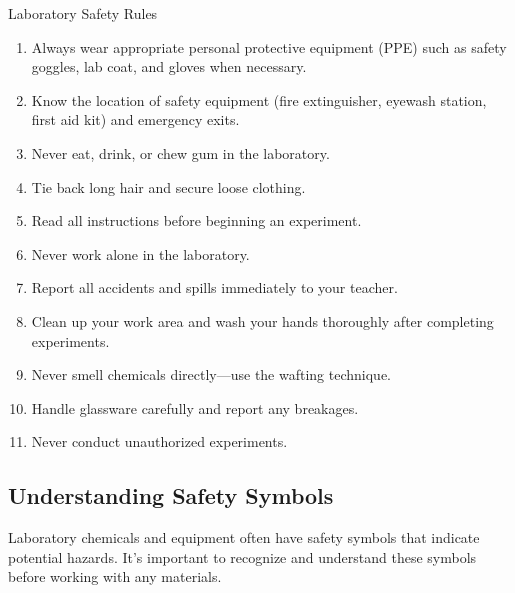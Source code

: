 \begin{keyconcept}{Laboratory Safety Rules}
\begin{enumerate}
    \item Always wear appropriate personal protective equipment (PPE) such as safety goggles, lab coat, and gloves when necessary.
    
    \item Know the location of safety equipment (fire extinguisher, eyewash station, first aid kit) and emergency exits.
    
    \item Never eat, drink, or chew gum in the laboratory.
    
    \item Tie back long hair and secure loose clothing.
    
    \item Read all instructions before beginning an experiment.
    
    \item Never work alone in the laboratory.
    
    \item Report all accidents and spills immediately to your teacher.
    
    \item Clean up your work area and wash your hands thoroughly after completing experiments.
    
    \item Never smell chemicals directly—use the wafting technique.
    
    \item Handle glassware carefully and report any breakages.
    
    \item Never conduct unauthorized experiments.
\end{enumerate}
\end{keyconcept}


\subsection{Understanding Safety Symbols}

Laboratory chemicals and equipment often have safety symbols that indicate potential hazards. It's important to recognize and understand these symbols before working with any materials.

